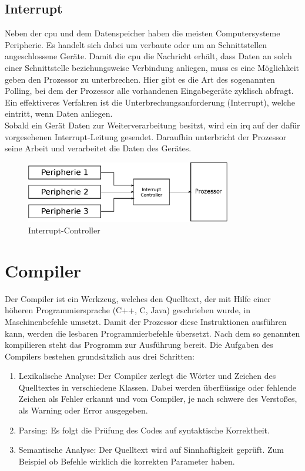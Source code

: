 \subsection{Interrupt}\label{kap:interrupt}
Neben der \ac{cpu} und dem Datenspeicher haben die meisten Computersysteme Peripherie. Es handelt sich dabei um verbaute oder um an Schnittstellen angeschlossene Geräte.
Damit die \ac{cpu} die Nachricht erhält, dass Daten an solch einer Schnittstelle beziehungsweise Verbindung anliegen, muss es eine Möglichkeit geben den Prozessor zu
unterbrechen. Hier gibt es die Art des sogenannten Polling, bei dem der Prozessor alle vorhandenen Eingabegeräte zyklisch abfragt. Ein effektiveres Verfahren ist die
Unterbrechungsanforderung (Interrupt), welche eintritt, wenn Daten anliegen. \\
Sobald ein Gerät Daten zur Weiterverarbeitung besitzt, wird ein \ac{irq} auf der dafür vorgesehenen Interrupt-Leitung gesendet. Daraufhin unterbricht der Prozessor
seine Arbeit und verarbeitet die Daten des Gerätes.\cite{irq}\\

\begin{figure}[H]
\centering
\includegraphics[width=0.8\textwidth]{Hauptteil/irq.eps}
\caption{Interrupt-Controller}\label{fig:irq}
\end{figure}

\section{Compiler}\label{kap:compiler}

Der Compiler ist ein Werkzeug, welches den Quelltext, der mit Hilfe einer höheren Programmiersprache (C++, C, Java) geschrieben wurde, in Maschinenbefehle umsetzt. Damit der Prozessor diese Instruktionen ausführen kann, werden die lesbaren Programmierbefehle übersetzt. Nach dem so genannten kompilieren steht das Programm zur Ausführung bereit.
Die Aufgaben des Compilers bestehen grundsätzlich aus drei Schritten:\cite{compiler}
\begin{enumerate}
  \item Lexikalische Analyse:
  	Der Compiler zerlegt die Wörter und Zeichen des Quelltextes in verschiedene Klassen. Dabei werden überflüssige oder fehlende Zeichen als Fehler erkannt und vom Compiler, je nach
  schwere des Verstoßes, als Warning oder Error ausgegeben.
  \item Parsing:
  	Es folgt die Prüfung des Codes auf syntaktische Korrektheit.
  \item Semantische Analyse: Der Quelltext wird auf Sinnhaftigkeit geprüft. Zum Beispiel ob Befehle wirklich die korrekten Parameter haben.
\end{enumerate}

